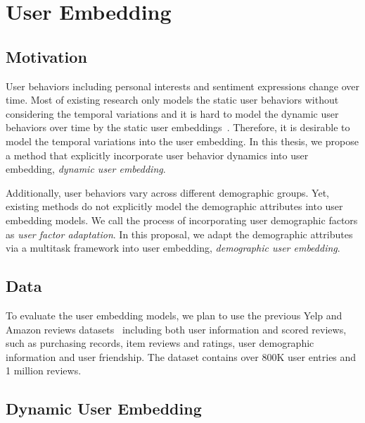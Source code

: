 \chapter{User Embedding}
\label{chp:userEmbed}

\section{Motivation}
User behaviors including personal interests and sentiment expressions change over time. 
Most of existing research only models the static user behaviors without considering the temporal variations and it is hard to model the dynamic user behaviors over time by the static user embeddings~\cite{pan2019social}.
Therefore, it is desirable to model the temporal variations into the user embedding.
In this thesis, we propose a method that explicitly incorporate user behavior dynamics into user embedding, \textit{dynamic user embedding}.

Additionally, user behaviors vary across different demographic groups.
Yet, existing methods do not explicitly model the demographic attributes into user embedding models. 
We call the process of incorporating user demographic factors as \textit{user factor adaptation}.
In this proposal, we adapt the demographic attributes via a multitask framework  into user embedding, \textit{demographic user embedding}.  



\section{Data}
To evaluate the user embedding models, we plan to use the previous Yelp and Amazon reviews datasets~\cite{huang2019neuraluser} including both user information and scored reviews, such as purchasing records, item reviews and ratings, user demographic information and user friendship.
The dataset contains over 800K user entries and 1 million reviews.


\section{Dynamic User Embedding}

